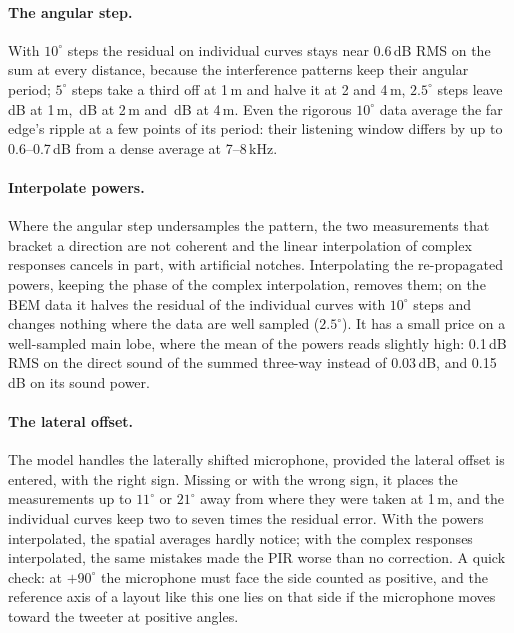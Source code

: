 \documentclass[11pt,a4paper]{article}
\begin{document}
\paragraph{The angular step.} With $10^\circ$ steps the residual on individual curves stays near 0.6\,dB RMS
on the sum at every distance, because the interference patterns keep their angular period; $5^\circ$ steps
take a third off at 1\,m and halve it at 2 and 4\,m, $2.5^\circ$ steps leave \bemSysFineOne\,dB at 1\,m,
\bemSysFineTwo\,dB at 2\,m and \bemSysFineFour\,dB at 4\,m. Even the rigorous $10^\circ$ data average the far
edge's ripple at a few points of its period: their listening window differs by up to 0.6--0.7\,dB from a
dense average at 7--8\,kHz.

\paragraph{Interpolate powers.} Where the angular step undersamples the pattern, the two measurements
that bracket a direction are not coherent and the linear interpolation of complex responses cancels in
part, with artificial notches. Interpolating the re-propagated powers, keeping the phase of the complex
interpolation, removes them; on the BEM data it halves the residual of the individual curves with
$10^\circ$ steps and changes nothing where the data are well sampled ($2.5^\circ$). It has a small price on a
well-sampled main lobe, where the mean of the powers reads slightly high: 0.1\,dB RMS on the direct sound
of the summed three-way instead of 0.03\,dB, and 0.15\,dB on its sound power.

\paragraph{The lateral offset.} The model handles the laterally shifted microphone, provided the lateral
offset is entered, with the right sign. Missing or with the wrong sign, it places the measurements up to
$11^\circ$ or $21^\circ$ away from where they were taken at 1\,m, and the individual curves keep two to seven
times the residual error. With the powers interpolated, the spatial averages hardly notice; with the
complex responses interpolated, the same mistakes made the PIR worse than no correction. A quick check: at
$+90^\circ$ the microphone must face the side counted as positive, and the reference axis of a layout like
this one lies on that side if the microphone moves toward the tweeter at positive angles.
\end{document}
